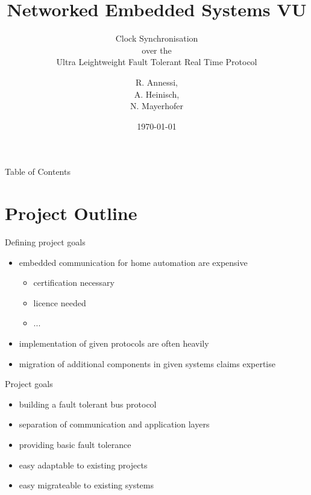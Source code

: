 \documentclass{beamer}
\title {Networked Embedded Systems VU}
\subtitle {Clock Synchronisation\\over the\\Ultra Leightweight Fault Tolerant Real Time Protocol}
\author{R. Annessi,\\ A. Heinisch,\\ N. Mayerhofer}
\date{\customdate\today}
\begin{document}
\begin{frame}
  \titlepage
\end{frame}
 \logo{}

\begin{frame}{Table of Contents}
  \tableofcontents
\end{frame}


\section{Project Outline}
\begin{frame}{Defining project goals}%
\begin{center}
\begin{itemize}
  \item embedded communication for home automation are expensive
    \begin{itemize}
      \item certification necessary
      \item licence needed
      \item ...
    \end{itemize}
  \item implementation of given protocols are often heavily
  \item migration of additional components in given systems claims expertise
\end{itemize}
\end{center}
\end{frame}

\begin{frame}{Project goals}%
\begin{center}
\begin{itemize}
 \item \begin{large}building a fault tolerant bus protocol\end{large}
 \item \begin{large}separation of communication and application layers\end{large}
 \item \begin{large}providing basic fault tolerance\end{large}
 \item \begin{large}easy adaptable to existing projects\end{large}
 \item \begin{large}easy migrateable to existing systems\end{large}
\end{itemize}
\end{center}
\end{frame}
\end{document}

